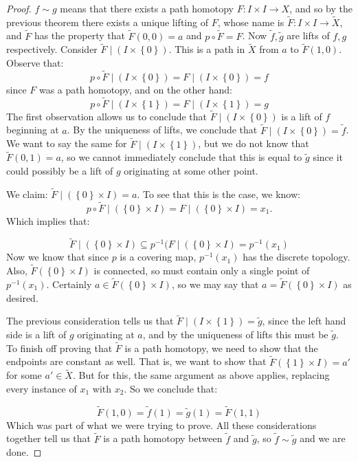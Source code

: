 \documentclass[11pt,reqno]{amsart}
\theoremstyle{definition}
\begin{document}
    \begin{proof}
    $f\sim g$ means that there exists a path homotopy $F\colon I\times I\to X$, and so by the previous theorem there exists a unique lifting of $F$, whose name is $\tilde{F}\colon I\times I\to \tilde{X}$, and $\tilde{F}$ has the property that $\tilde{F}(0,0)=a$ and $p\circ \tilde{F}=F$. Now $\tilde{f}, \tilde{g}$ are lifts of $f,g$ respectively. Consider $\tilde{F}\mid (I\times \left\{0\right\})$. This is a path in $\tilde{X}$ from $a$ to $\tilde{F}(1,0)$. Observe that:
    \[p\circ \tilde{F}\mid (I\times \left\{0\right\})=F\mid (I\times \left\{0\right\})=f
    \]
since $F$ was a path homotopy, and on the other hand:
	\[p\circ \tilde{F}\mid (I\times \left\{1\right\})=F\mid (I\times \left\{1\right\})=g
\]
The first observation allows us to conclude that $\tilde{F}\mid (I\times \left\{0\right\})$ is a lift of $f$ beginning at $a$. By the uniqueness of lifts, we conclude that $\tilde{F}\mid (I\times \left\{0\right\})=\tilde{f}$. We want to say the same for $\tilde{F}\mid (I\times \left\{1\right\})$, but we do not know that $\tilde{F}(0,1)=a$, so we cannot immediately conclude that this is equal to $\tilde{g}$ since it could possibly be a lift of $g$ originating at some other point.
\par
We claim: $\tilde{F}\mid (\left\{0\right\} \times I)=a$. To see that this is the case, we know:
	\[p\circ \tilde{F}\mid (\left\{0\right\} \times I)=F\mid(\left\{0\right\} \times I)=x_1.
\]
    Which implies that:
    
	\[\tilde{F}\mid (\left\{0\right\} \times I)\subseteq p^{-1}(F\mid (\left\{0\right\} \times I)=p^{-1}(x_1)
\]
    Now we know that since $p$ is a covering map, $p^{-1}(x_1)$ has the discrete topology. Also, $\tilde{F} (\left\{0\right\} \times I)$ is connected, so must contain only a single point of $p^{-1}(x_1)$. Certainly $a\in \tilde{F}(\left\{0\right\} \times I)$, so we may say that $a=\tilde{F}(\left\{0\right\} \times I)$ as desired.
    \par
    The previous consideration tells us that $\tilde{F}\mid (I\times \left\{1\right\})=\tilde{g}$, since the left hand side is a lift of $g$ originating at $a$, and by the uniqueness of lifts this must be $\tilde{g}$. To finish off proving that $\tilde{F}$ is a path homotopy, we need to show that the endpoints are constant as well. That is, we want to show that $\tilde{F}(\left\{1\right\} \times I)=a'$ for some $a'\in \tilde{X}$. But for this, the same argument as above applies, replacing every instance of $x_1$ with $x_2$. So we conclude that: 
    
	\[\tilde{F}(1,0)=\tilde{f}(1)=\tilde{g}(1)=\tilde{F}(1,1)
\]
    Which was part of what we were trying to prove. All these considerations together tell us that $\tilde{F}$ is a path homotopy between $\tilde f$ and $\tilde{g}$, so $\tilde{f}\sim \tilde{g}$ and we are done.
    \end{proof}
    
\end{document}
